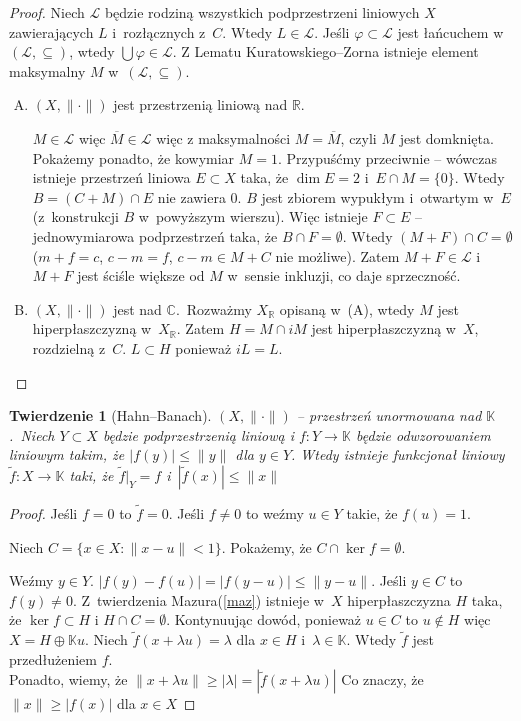 \documentclass[11pt]{mwrep}
\renewcommand{\[}{\begin{equation}}
\renewcommand{\]}{\end{equation}}
\newcommand{\C}{{\ensuremath{\mathbb C}}}
\newcommand{\R}{{\ensuremath{\mathbb R}}}
\newcommand{\K}{\ensuremath{\mathbb{K}}}
\newcommand{\norm}{\|\cdot\|}
\newtheorem{twr}[subsection]{Twierdzenie}%
\newcounter{numer}
\begin{document}
\begin{proof}
	Niech $\mathcal{L}$ będzie rodziną wszystkich podprzestrzeni liniowych $X$ zawierających $L$ i~rozłącznych z~$C$.
	Wtedy $L \in \mathcal{L}$. Jeśli $\varphi \subset \mathcal{L}$ jest łańcuchem w~$(\mathcal{L},\subseteq)$, wtedy $\bigcup \varphi\in \mathcal{L}$.
	Z Lematu Kuratowskiego--Zorna istnieje element maksymalny $M$ w~$(\mathcal{L}, \subseteq)$.
	\begin{enumerate}[(A)]
		\item $(X,\|\cdot\|)$ jest przestrzenią liniową nad \R.
		
$M\in \mathcal{L}$ więc $\overline{M} \in \mathcal{L}$ więc z maksymalności $M=\overline{M}$, czyli $M$ jest domknięta.
			Pokażemy ponadto, że kowymiar $M=1$. Przypuśćmy przeciwnie -- wówczas istnieje przestrzeń liniowa $E\subset X$ taka, że $\dim E =2$ i~$E\cap M=\{0\}$.
			Wtedy $B=(C+M)\cap E$ nie zawiera 0.
			$B$ jest zbiorem wypukłym i~otwartym w~$E$ (z~konstrukcji $B$ w~powyższym wierszu).
			Więc istnieje $F\subset E$ -- jednowymiarowa podprzestrzeń taka, że $B\cap F = \emptyset$.
			Wtedy $(M+F)\cap C= \emptyset $ ($m+f=c$, $c-m=f$, $c-m \in M+C$ nie możliwe).
			Zatem $M+F \in \mathcal{L}$ i~$M+F$ jest ściśle większe od $M$ w~sensie inkluzji, co daje sprzeczność.
		\item $(X,\norm)$ jest nad \C.~Rozważmy $X_\R$ opisaną w~(A), wtedy $M$ jest hiperpłaszczyzną w~$X_{\R}$.
			Zatem $H=M\cap iM$ jest hiperpłaszczyzną w~$X$, rozdzielną z~$C$. $L\subset H$ ponieważ $iL=L$.
	\end{enumerate}
\end{proof}
\begin{twr}[Hahn--Banach]
	$(X,\norm)$ -- przestrzeń unormowana nad \K.~Niech $Y\subset X$ będzie podprzestrzenią liniową i 
	$f:Y\to \K$ będzie odwzorowaniem liniowym takim, że $|f(y)| \le \|y\|$ dla $y\in Y$.
	Wtedy istnieje funkcjonał liniowy $\tilde{f} :X \to \K$ taki, że $\tilde{f}|_Y = f$ i~$|\tilde{f}(x)|\le \|x\|$
\end{twr}
\begin{proof}
  Jeśli $f=0$ to $\tilde{f} = 0$. Jeśli $f\not =0$ to weźmy $u \in Y$  takie, że $f(u)=1$.\par
	Niech $C =\{ x \in X: \|x - u\|<1\}$. Pokażemy, że $C\cap \ker f = \emptyset$.\par
	Weźmy $y\in Y$.
	$|f(y)-f(u)|=|f(y-u)|\le \|y - u\|$. Jeśli $y\in C$ to  $f(y) \not =0$.
	Z~{twierdzenia Mazura(\ref{maz})} istnieje w~$X$ hiperpłaszczyzna $H$ taka, że $\ker f\subset H$ i $H\cap C = \emptyset$.
	Kontynuując dowód, ponieważ $u\in C$ to $u \not \in H$ więc $X=H\oplus \K u$.
	Niech $\tilde{f}(x+\lambda u) = \lambda$ dla $x\in H$ i~$\lambda \in \K$. Wtedy $\tilde{f}$ jest  przedłużeniem $f$.\\
	Ponadto, wiemy, że $\|x +\lambda u\|\ge |\lambda| = |\tilde{f} (x+\lambda u)|$ Co znaczy, że $\|x\| \ge |f(x)|$ dla $x\in X$
\end{proof}
\end{document}
